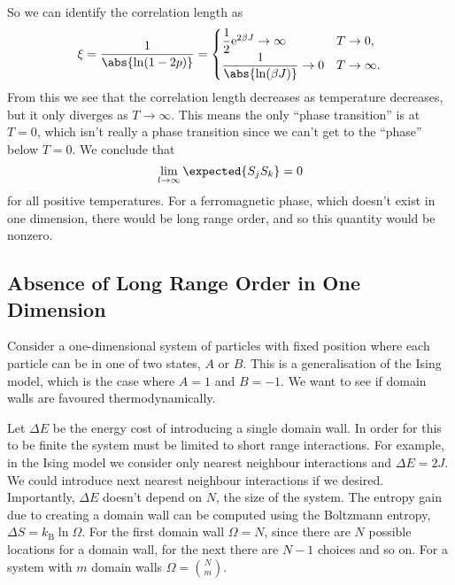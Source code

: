 \documentclass[fleqn]{NotesClass}
\newcommand*{\boltzmann}{k_{\mathrm{B}}}
\newcommand*{\e}{\mathrm{e}}
\begin{document}
    So we can identify the correlation length as
    \begin{equation}
        \xi = \frac{1}{\abs{\ln(1 - 2p)}} = 
        \begin{cases}
            \dfrac{1}{2}\e^{2\beta J} \to \infty & T \to 0,\\
            \dfrac{1}{\abs{\ln(\beta J)}} \to 0 & T \to \infty.
        \end{cases}
    \end{equation}
    From this we see that the correlation length decreases as temperature decreases, but it only diverges as \(T \to \infty\).
    This means the only \enquote{phase transition} is at \(T = 0\), which isn't really a phase transition since we can't get to the \enquote{phase} below \(T = 0\).
    We conclude that
    \begin{equation}
        \lim_{l \to \infty} \expected{S_j S_k} = 0
    \end{equation}
    for all positive temperatures.
    For a ferromagnetic phase, which doesn't exist in one dimension, there would be long range order, and so this quantity would be nonzero.
    
    \subsection{Absence of Long Range Order in One Dimension}
    Consider a one-dimensional system of particles with fixed position where each particle can be in one of two states, \(A\) or \(B\).
    This is a generalisation of the Ising model, which is the case where \(A = 1\) and \(B = -1\).
    We want to see if domain walls are favoured thermodynamically.
    
    Let \(\Delta E\) be the energy cost of introducing a single domain wall.
    In order for this to be finite the system must be limited to short range interactions.
    For example, in the Ising model we consider only nearest neighbour interactions and \(\Delta E = 2J\).
    We could introduce next nearest neighbour interactions if we desired.
    Importantly, \(\Delta E\) doesn't depend on \(N\), the size of the system.
    The entropy gain due to creating a domain wall can be computed using the Boltzmann entropy, \(\Delta S = \boltzmann \ln \Omega\).
    For the first domain wall \(\Omega = N\), since there are \(N\) possible locations for a domain wall, for the next there are \(N - 1\) choices and so on.
    For a system with \(m\) domain walls \(\Omega = \binom{N}{m}\).
    
\end{document}
